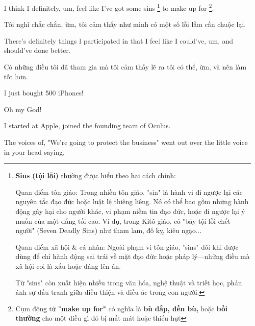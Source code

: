 \documentclass[a4paper]{article}
\begin{document}
	I think I definitely, um, feel like I've got some sins \footnote{
		\textbf{Sins (tội lỗi)} thường được hiểu theo hai cách chính:
		
		Quan điểm tôn giáo: Trong nhiều tôn giáo, "sin" là hành vi đi ngược lại các nguyên tắc đạo đức hoặc luật lệ thiêng liêng. Nó có thể bao gồm những hành động gây hại cho người khác, vi phạm niềm tin đạo đức, hoặc đi ngược lại ý muốn của một đấng tối cao. Ví dụ, trong Kitô giáo, có "bảy tội lỗi chết người" (Seven Deadly Sins) như tham lam, đố kỵ, kiêu ngạo...
		
		Quan điểm xã hội \& cá nhân: Ngoài phạm vi tôn giáo, "sins" đôi khi được dùng để chỉ hành động sai trái về mặt đạo đức hoặc pháp lý—những điều mà xã hội coi là xấu hoặc đáng lên án.
		
		Từ "sins" còn xuất hiện nhiều trong văn hóa, nghệ thuật và triết học, phản ánh sự đấu tranh giữa điều thiện và điều ác trong con người.
	} to make up for \footnote{Cụm động từ \textbf{"make up for"} có nghĩa là \textbf{bù đắp, đền bù,} hoặc \textbf{bồi thường} cho một điều gì đó bị mất mát hoặc thiếu hụt}.
	
	\begin{vietnamese-v2}
		Tôi nghĩ chắc chắn, ừm, tôi cảm thấy như mình có một số lỗi lầm cần chuộc lại.
	\end{vietnamese-v2}
	
	
	There's definitely things I participated in that I feel like I could've, um, and should've done better.
	
	\begin{vietnamese-v2}
		Có những điều tôi đã tham gia mà tôi cảm thấy lẽ ra tôi có thể, ừm, và nên làm tốt hơn.
	\end{vietnamese-v2}
	
	
	I just bought 500 iPhones!
	
	Oh my God!

	I started at Apple, joined the founding team of Oculus.

	The voices of, "We're going to protect the business" went out over the little voice in your head saying,
\end{document}
